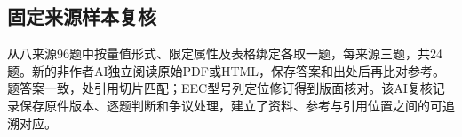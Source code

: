 \subsection{固定来源样本复核}
\label{sec:fixed-source-review}

从八来源96题中按量值形式、限定属性及表格绑定各取一题，每来源三题，共24题。新的非作者AI独立阅读原始PDF或HTML，保存答案和出处后再比对参考。\LocalSourceReviewed{}题答案一致，\LocalSourceSpans{}处引用切片匹配；EEC型号列定位修订得到版面核对。该AI复核记录保存原件版本、逐题判断和争议处理，建立了资料、参考与引用位置之间的可追溯对应。
